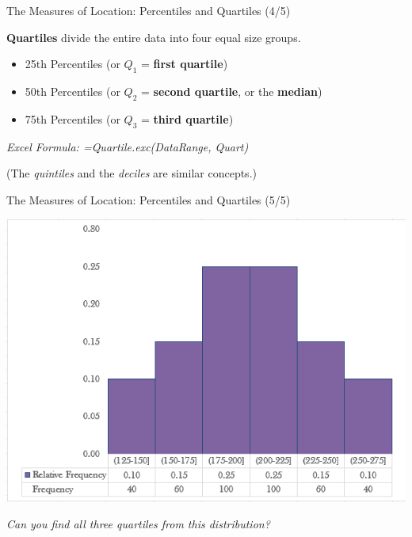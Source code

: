 \documentclass{beamer}
\begin{document}
\begin{frame}{The Measures of Location: Percentiles and Quartiles (4/5)}

\textbf{Quartiles} divide the entire data into four equal size groups.




\begin{itemize}
\item 25th Percentiles (or $Q_1$ = \textbf{first quartile})
\item 50th Percentiles (or $Q_2$ = \textbf{second quartile}, or the \textbf{median})
\item 75th Percentiles (or $Q_3$ = \textbf{third quartile})
\end{itemize}

\begin{flushright}
\textit{Excel Formula: =Quartile.exc(DataRange, Quart)}

\end{flushright}


(The \textit{quintiles} and the \textit{deciles} are similar concepts.)

\end{frame}


\begin{frame}{The Measures of Location: Percentiles and Quartiles (5/5)}
\begin{center}
\includegraphics[scale=0.5]{images/ch2Quartiles.png}

\textit{Can you find all three quartiles from this distribution?
}
\end{center}
\end{frame}
\end{document}
